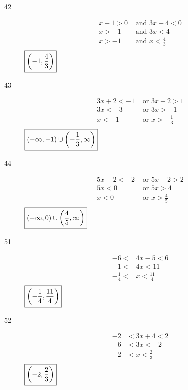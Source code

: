 \documentclass[letterpaper, landscape]{exam}
\begin{document}
\begin{description}
      \item[42]
        \begin{align*}
          x + 1 > 0 & \text{ and } 3x - 4 < 0 \\
          x > -1    & \text{ and } 3x < 4 \\
          x > -1    & \text{ and } x < \frac{4}{3} \\
        \end{align*}
        $\boxed{ \intoo{ -1, \frac{4}{3} } }$

      \item[43]
        \begin{align*}
          3x + 2 < -1 & \text{ or } 3x + 2 > 1 \\
          3x < -3     & \text{ or } 3x > -1 \\
          x < -1      & \text{ or } x > - \frac{1}{3} \\
        \end{align*}
        $\boxed{ \intoo{ -\infty, -1 } \cup \intoo{ -\frac{1}{3}, \infty } }$

      \item[44]
        \begin{align*}
          5x - 2 < -2 & \text{ or } 5x - 2 > 2 \\
          5x < 0      & \text{ or } 5x > 4 \\
          x < 0       & \text{ or } x > \frac{4}{5} \\
        \end{align*}
        $\boxed{ \intoo{ -\infty, 0 } \cup \intoo{ \frac{4}{5}, \infty } }$

      \item[51]
        \begin{align*}
          -6 <            & 4x - 5 < 6 \\
          -1 <            & 4x < 11 \\
          - \frac{1}{4} < & x < \frac{11}{4} \\
        \end{align*}
        $\boxed{ \intoo{ - \frac{1}{4}, \frac{11}{4} } }$

      \item[52]
        \begin{align*}
          -2 & < 3x + 4 < 2 \\
          -6 & < 3x < -2 \\
          -2 & < x < \frac{2}{3} \\
        \end{align*}
        $\boxed{ \intoo{ -2, \frac{2}{3} } }$


\end{description}
\end{document}
